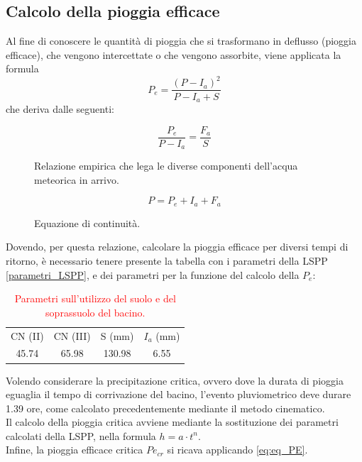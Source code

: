 \subsection{Calcolo della pioggia efficace}
Al fine di conoscere le quantità di pioggia che si trasformano in deflusso (pioggia efficace), che vengono intercettate o che vengono assorbite, viene applicata la formula 
\begin{equation}
P_e = \frac{(P-I_a)^2}{P-I_a+S} 
\label{eq:eq_PE}
\end{equation}
che deriva dalle seguenti:
\begin{figure}[H]
\begin{equation}
    \frac{P_e}{P-I_a} = \frac{F_a}{S} 
\end{equation}
\caption*{Relazione empirica che lega le diverse componenti dell'acqua meteorica in arrivo.}
\end{figure}
\begin{figure}[H]
\begin{equation}
    P= P_e + I_a + F_a     
\end{equation}
\caption*{Equazione di continuità.}
\end{figure}

Dovendo, per questa relazione, calcolare la pioggia efficace per diversi tempi di ritorno, è necessario tenere presente la tabella con i parametri della LSPP \ref{parametri_LSPP}, e dei parametri per la funzione del calcolo della $P_e$:
\begin{table}[H] \centering
    \caption{\textcolor{red}{Parametri sull'utilizzo del suolo e del soprassuolo del bacino.}}
    \begin{tabular}{cccc}
    \toprule   
  CN (II)  & CN (III)  & S (mm) & $I_a$ (mm)  \\
  45.74  &      65.98       & 130.98  & 6.55 \\
  \bottomrule  
    \end{tabular}
    \end{table}

Volendo considerare la precipitazione critica, ovvero dove la durata di pioggia eguaglia il tempo di corrivazione del bacino, l'evento pluviometrico deve durare 1.39 ore, come calcolato precedentemente mediante il metodo cinematico.\\
Il calcolo della pioggia critica avviene mediante la sostituzione dei parametri calcolati della LSPP, nella formula $h=a\cdot t^n$.\\
Infine, la pioggia efficace critica $Pe_{cr}$ si ricava applicando \eqref{eq:eq_PE}.
    			
